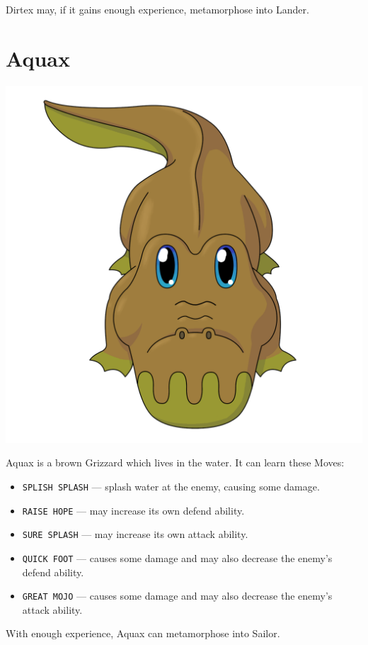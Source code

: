 \documentclass[10pt,twocolumn,openany,article]{memoir}
\begin{document}
\begin{description}
Dirtex may, if it gains enough experience, metamorphose into Lander.

\fi

\section{Aquax}

\includegraphics[width=\columnwidth]{../Manual/Aquax.png}

Aquax is a brown Grizzard which lives in the water. It can learn these
Moves:

\begin{itemize}
\item  \texttt{SPLISH SPLASH}  --- splash  water at  the enemy,  causing
  some damage. 
\item \texttt{RAISE HOPE} --- may increase its own defend ability.
\item \texttt{SURE SPLASH} --- may increase its own attack ability.
\item \texttt{QUICK FOOT}  --- causes some damage and  may also decrease
  the enemy's defend ability.
\item \texttt{GREAT MOJO}  --- causes some damage and  may also decrease
  the enemy's attack ability.
\end{itemize}

With enough experience, Aquax can metamorphose into Sailor.


\end{description}
\end{document}
